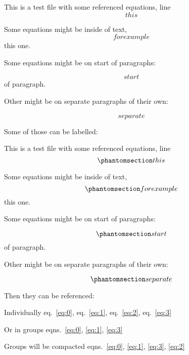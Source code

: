This is a test file with some referenced equations, line \[ this \]

Some equations might be inside of text, \[ for example \] this one.

Some equations might be on start of paragraphs:

\[ start \] of paragraph.

Other might be on separate paragraphs of their own:

\[ separate \]

Some of those can be labelled:

This is a test file with some referenced equations, line
\begin{equation}\protect\phantomsection\label{eq:0}{ this }\end{equation}

Some equations might be inside of text,
\begin{equation}\protect\phantomsection\label{eq:1}{ for example }\end{equation}
this one.

Some equations might be on start of paragraphs:

\begin{equation}\protect\phantomsection\label{eq:2}{ start }\end{equation}
of paragraph.

Other might be on separate paragraphs of their own:

\begin{equation}\protect\phantomsection\label{eq:3}{ separate }\end{equation}

Then they can be referenced:

Individually eq.~\ref{eq:0}, eq.~\ref{eq:1}, eq.~\ref{eq:2},
eq.~\ref{eq:3}

Or in groups eqns.~\ref{eq:0}, \ref{eq:1}, \ref{eq:3}

Groups will be compacted
eqns.~\ref{eq:0}, \ref{eq:1}, \ref{eq:3}, \ref{eq:2}
